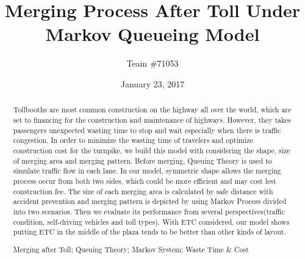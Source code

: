 \documentclass[a4paper, 11pt]{article}
\title{Merging Process After Toll Under Markov Queueing Model}
\author{Team \#71053}
\date{January 23, 2017}
\begin{document}
\begin{abstract}
Tollbooths are most common construction on the highway all over the world, which are set to financing for the construction and maintenance of highways. However, they takes passengers unexpected wasting time to stop and wait especially when there is traffic congestion. In order to minimize the wasting time of travelers and optimize construction cost for the turnpike, we build this model with considering the shape, size of merging area and merging pattern. Before merging, Queuing Theory is used to simulate traffic flow in each lane. In our model, symmetric shape allows the merging process occur from both two sides, which could be more efficient and may cost lest construction fee. The size of each merging area is calculated by safe distance with accident prevention and merging pattern is depicted by using Markov Process divided into two scenarios. Then we evaluate its performance from several perspectives(traffic condition, self-driving vehicles and toll types).  With ETC considered, our model shows putting ETC in the middle of the plaza tends to be better than other kinds of layout.

\begin{keywords}
Merging after Toll; Queuing Theory; Markov System; Waste Time \& Cost
\end{keywords}

\end{abstract}

\maketitle
\pagestyle{empty}
\newpage
\tableofcontents

\pagestyle{fancy}

\end{document}
